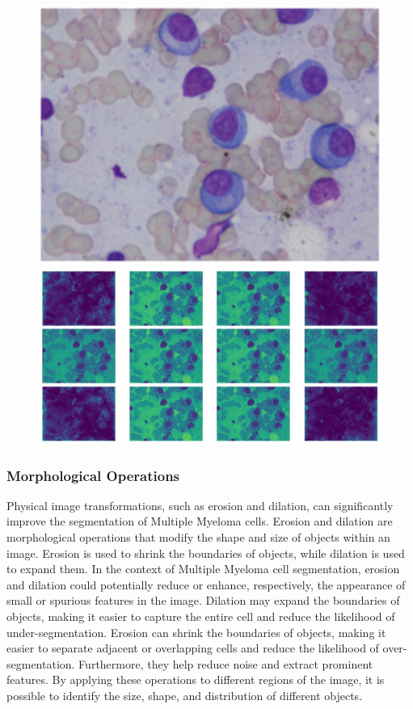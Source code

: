 \documentclass{article}
\begin{document}
\begin{figure}
  \centering
  \begin{minipage}{.5\textwidth}
    \centering
    \includegraphics[width=.5\linewidth]{1.png}
  \end{minipage}%
  \begin{minipage}{.4\textwidth}
    \centering
    \includegraphics[width=.8\linewidth]{2.jpg}
  \end{minipage}
\end{figure}

\subsubsection{Morphological Operations}

Physical image transformations, such as erosion and dilation, can significantly improve the segmentation of Multiple Myeloma cells. Erosion and dilation are morphological operations that modify the shape and size of objects within an image. Erosion is used to shrink the boundaries of objects, while dilation is used to expand them. In the context of Multiple Myeloma cell segmentation, erosion and dilation could potentially reduce or enhance, respectively, the appearance of small or spurious features in the image. Dilation may expand the boundaries of objects, making it easier to capture the entire cell and reduce the likelihood of under-segmentation. Erosion can shrink the boundaries of objects, making it easier to separate adjacent or overlapping cells and reduce the likelihood of over-segmentation. Furthermore, they help reduce noise and extract prominent features. By applying these operations to different regions of the image, it is possible to identify the size, shape, and distribution of different objects.
\end{document}
